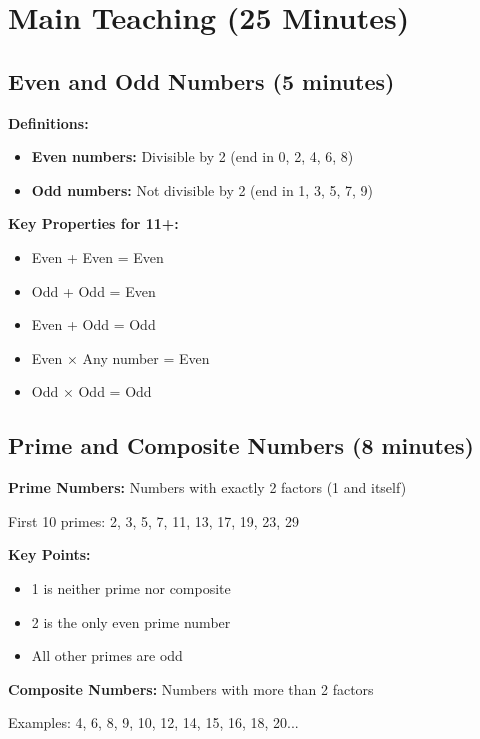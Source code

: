 \documentclass{article}
\begin{document}
\section{Main Teaching (25 Minutes)}

\subsection{Even and Odd Numbers (5 minutes)}

\textbf{Definitions:}
\begin{itemize}
    \item \textbf{Even numbers:} Divisible by 2 (end in 0, 2, 4, 6, 8)
    \item \textbf{Odd numbers:} Not divisible by 2 (end in 1, 3, 5, 7, 9)
\end{itemize}

\textbf{Key Properties for 11+:}
\begin{itemize}
    \item Even + Even = Even
    \item Odd + Odd = Even  
    \item Even + Odd = Odd
    \item Even × Any number = Even
    \item Odd × Odd = Odd
\end{itemize}

\subsection{Prime and Composite Numbers (8 minutes)}

\textbf{Prime Numbers:} Numbers with exactly 2 factors (1 and itself)
\begin{center}
First 10 primes: 2, 3, 5, 7, 11, 13, 17, 19, 23, 29
\end{center}

\textbf{Key Points:}
\begin{itemize}
    \item 1 is neither prime nor composite
    \item 2 is the only even prime number
    \item All other primes are odd
\end{itemize}

\textbf{Composite Numbers:} Numbers with more than 2 factors
\begin{center}
Examples: 4, 6, 8, 9, 10, 12, 14, 15, 16, 18, 20...
\end{center}
\end{document}
